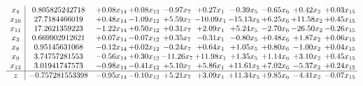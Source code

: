 \documentclass[9pt]{article}
\begin{document}
\[\begin{array}{c| c c@{\hskip 2pt} c@{\hskip 2pt} c@{\hskip 2pt} c@{\hskip 2pt} c@{\hskip 2pt} c@{\hskip 2pt} c@{\hskip 2pt} c@{\hskip 2pt} }
 x_{4}   &  0.805825242718 & +  0.08 x_{14} & +  0.08 x_{12} & -0.97 x_{7} & +  0.27 x_{1} & -0.39 x_{5} & -0.65 x_{6} & +  0.42 x_{2} & +  0.03 x_{15}\\
 x_{10}   &  27.7184466019 & +  0.48 x_{14} & -1.09 x_{12} & +  5.59 x_{7} & -10.09 x_{1} & -15.13 x_{5} & +  6.25 x_{6} & + 11.58 x_{2} & +  0.45 x_{15}\\
 x_{11}   &  17.2621359223 & -1.22 x_{14} & +  0.50 x_{12} & +  0.31 x_{7} & +  2.09 x_{1} & +  5.24 x_{5} & -2.70 x_{6} & -26.50 x_{2} & -0.26 x_{15}\\
 x_{3}   &  0.669902912621 & +  0.07 x_{14} & -0.07 x_{12} & +  0.35 x_{7} & -0.31 x_{1} & -0.80 x_{5} & +  0.48 x_{6} & +  1.87 x_{2} & +  0.06 x_{15}\\
 x_{8}   &  0.95145631068 & -0.12 x_{14} & +  0.02 x_{12} & -0.24 x_{7} & +  0.64 x_{1} & +  1.05 x_{5} & +  0.80 x_{6} & -1.00 x_{2} & +  0.04 x_{15}\\
 x_{9}   &  3.74757281553 & -0.56 x_{14} & +  0.30 x_{12} & -11.26 x_{7} & + 11.98 x_{1} & +  1.35 x_{5} & +  1.14 x_{6} & +  3.10 x_{2} & +  0.45 x_{15}\\
 x_{13}   &  3.01941747573 & -0.98 x_{14} & -0.41 x_{12} & +  5.10 x_{7} & +  5.86 x_{1} & + 11.61 x_{5} & +  7.02 x_{6} & -5.37 x_{2} & +  0.24 x_{15}\\
\hline
z    &  -0.757281553398 & -0.95 x_{14} & -0.10 x_{12} & +  5.21 x_{7} & +  3.09 x_{1} & + 11.34 x_{5} & +  9.85 x_{6} & -4.41 x_{2} & -0.07 x_{15}\\
\end{array}\]
\end{document}
